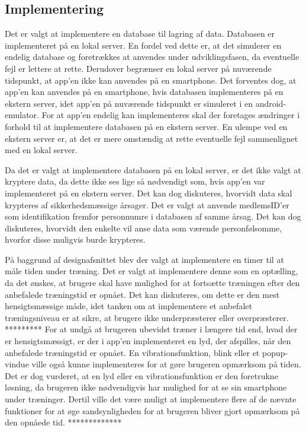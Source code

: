 \subsection{Implementering}
Det er valgt at implementere en database til lagring af data. Databasen er 
implementeret på en lokal server. En fordel ved dette er, at det simulerer en endelig database og foretrækkes at anvendes under udviklingsfasen, da eventuelle fejl er lettere at rette. Derudover begrænser en lokal server på nuværende tidspunkt, at app’en ikke kan anvendes på en smartphone. Det forventes dog, at app'en kan anvendes på en smartphone, hvis databasen implementeres på en ekstern server, idet app’en på nuværende tidspunkt er simuleret i en android-emulator. For at app’en endelig kan implementeres skal der foretages ændringer i forhold til at  implementere databasen på en ekstern server.
En ulempe ved en ekstern server er, at det er mere omstændig at rette eventuelle fejl sammenlignet med en lokal server. 

Da det er valgt at implementere databasen på en lokal server, er det ikke valgt at kryptere data, da dette ikke ses lige så nødvendigt som, hvis app’en var implementeret på en ekstern server. Det kan dog diskuteres, hvorvidt data skal krypteres af sikkerhedsmæssige årsager. Det er valgt at anvende medlemsID’er som identifikation fremfor personnumre i databasen af samme årsag. Det kan dog diskuteres, hvorvidt den enkelte vil anse data som værende personfølsomme, hvorfor disse muligvis burde krypteres. 

På baggrund af designafsnittet blev der valgt at implementere en timer til at måle tiden under træning. Det er valgt at implementere denne som en optælling, da det ønskes, at brugere skal have mulighed for at fortsætte træningen efter den anbefalede træningstid er opnået. Det kan diskuteres, om dette er den mest hensigtsmæssige måde, idet tanken om at implementere et anbefalet træningsniveau er at sikre, at brugere ikke underpræsterer eller overpræsterer. ********* For at undgå at brugeren ubevidst træner i længere tid end, hvad der er hensigtsmæssigt, er der i app'en implementeret en lyd, der afspilles, når den anbefalede træningstid er opnået. En vibrationsfunktion, blink eller et popup-vindue ville også kunne implementeres for at gøre brugeren opmærksom på tiden. Det er dog vurderet, at en lyd eller en vibrationsfunktion er den foretrukne løsning, da brugeren ikke nødvendigvis har mulighed for at se sin smartphone under træninger. Dertil ville det være muligt at implementere flere af de nævnte funktioner for at øge sandsynligheden for at brugeren bliver gjort opmærksom på den opnåede tid. 
*************

